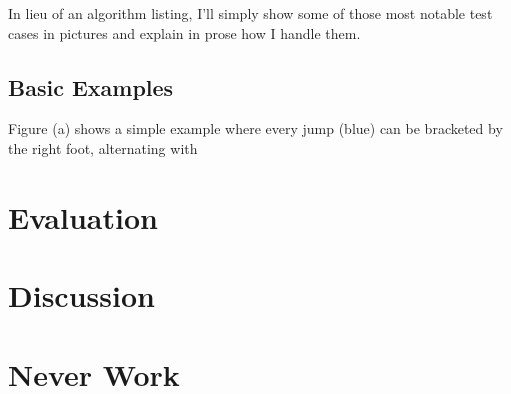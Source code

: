 \documentclass[10pt]{sigplanconf}
\begin{document}
In lieu of an algorithm listing, I'll simply show some of those most notable test cases in pictures and explain in prose how I handle them.


\subsection{Basic Examples}

Figure (a) shows a simple example where every jump (blue)
can be bracketed by the right foot,
alternating with 


\section{Evaluation}



\section{Discussion}








\section{Never Work}
\end{document}
